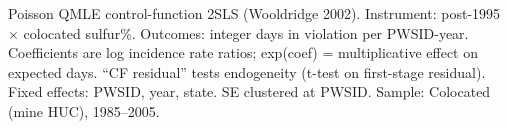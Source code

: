 \par \raggedright 
Poisson QMLE control-function 2SLS (Wooldridge 2002). Instrument: post-1995 $\times$ colocated sulfur\%. Outcomes: integer days in violation per PWSID-year. Coefficients are log incidence rate ratios; exp(coef) = multiplicative effect on expected days. ``CF residual'' tests endogeneity (t-test on first-stage residual). Fixed effects: PWSID, year, state. SE clustered at PWSID. Sample: Colocated (mine HUC), 1985--2005.
\par\endgroup


